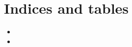 \documentclass[a4paper,10pt,english]{sphinxmanual}
\begin{document}
\chapter{Indices and tables}
\label{\detokenize{index:indices-and-tables}}\begin{itemize}
\item {} 
\sphinxAtStartPar
{}

\item {} 
\sphinxAtStartPar
{}

\end{itemize}



\renewcommand{\indexname}{Index}
\printindex
\end{document}
